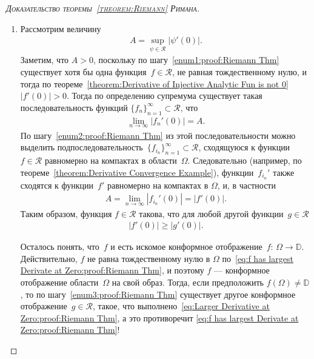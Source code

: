 \documentclass[../complex-analysis.tex]{subfiles}
\begin{document}
\begin{proof}[\normalfont\textsc{Доказательство теоремы~\ref{theorem:Riemann} Римана}]
\begin{enumerate}
  \item Рассмотрим величину
   \begin{align*}
    A = \sup_{\psi \in \mathcal R} \left| \psi'(0) \right|.
   \end{align*} Заметим, что $ A > 0 $, поскольку по шагу~\ref{enum1:proof:Riemann Thm} существует хотя бы одна функция~$ f \in \mathcal R $, не равная тождественному нулю, и тогда по теореме~\ref{theorem:Derivative of Injective Analytic Fun is not 0} $ \left| f'(0) \right| > 0 $. Тогда по определению супремума существует такая последовательность функций $ \{f_{n}\}_{n=1}^{\infty} \subset \mathcal R $, что
   \begin{align*}
    \lim_{n \to \infty} \left| f_n'(0) \right| = A.
   \end{align*} По шагу~\ref{enum2:proof:Riemann Thm} из этой последовательности можно выделить подпоследовательность~$ \{f_{i_n}\}_{n=1}^{\infty}  \subset\mathcal R$, сходящуюся к функции~$ f\in\mathcal R $ равномерно на компактах в области~$ \Omega $. Следовательно (например, по теореме~\ref{theorem:Derivative Convergence Example}), функции~$ f_{i_n}' $ также сходятся к функции~$ f' $ равномерно на компактах в $ \Omega $, и, в частности
   \begin{align*}
    A = \lim_{n \to \infty} \left| f_{i_n}'(0) \right| = \left| f'(0) \right|.
   \end{align*} Таким образом, функция $ f \in \mathcal R $ такова, что для любой другой функции~$ g \in \mathcal R $
   \begin{align}
    \label{eq:f has largest Derivate at Zero:proof:Riemann Thm}
    \left| f'(0) \right| \geqslant \left| g'(0) \right|.
   \end{align}

   Осталось понять, что~$ f $ и есть искомое конформное отображение~$ f \colon\,\Omega\to\mathbb D $. Действительно, $ f $ не равна тождественному нулю в $ \Omega $ по~\eqref{eq:f has largest Derivate at Zero:proof:Riemann Thm}, и поэтому $ f $ --- конформное отображение области~$ \Omega $ на свой образ. Тогда, если предположить $ f(\Omega) \neq \mathbb D $, то по шагу~\ref{enum3:proof:Riemann Thm} существует другое конформное отображение~$ g \in \mathcal R $, такое, что выполнено~\eqref{eq:Larger Derivative at Zero:proof:Riemann Thm}, а это противоречит \eqref{eq:f has largest Derivate at Zero:proof:Riemann Thm}!
 \end{enumerate}
\end{proof}
\end{document}
